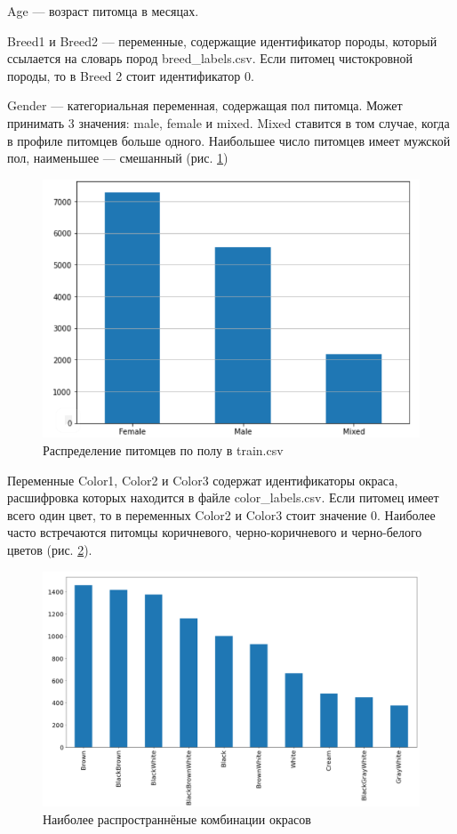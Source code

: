 \documentclass[14pt]{mmcs_article}
\begin{document}
Age --- возраст питомца в месяцах.

Breed1 и Breed2 --- переменные, содержащие идентификатор породы, который ссылается на словарь пород breed\_labels.csv. Если питомец чистокровной породы, то в Breed 2 стоит идентификатор 0.

Gender --- категориальная переменная, содержащая пол питомца. Может принимать 3 значения: male, female и mixed. Mixed ставится в том случае, когда в профиле питомцев больше одного. Наибольшее число питомцев имеет мужской пол, наименьшее — смешанный (рис. \ref{analyse:gender})

\begin{figure}[H]
	\centering
	\includegraphics[scale=0.8]{gender.png}
	\caption{Распределение питомцев по полу в train.csv}\label{analyse:gender}
\end{figure}

Переменные Color1, Color2 и Color3 содержат идентификаторы окраса, расшифровка которых находится в файле color\_labels.csv. Если питомец имеет всего один цвет, то в переменных Color2 и Color3 стоит значение 0. Наиболее часто встречаются питомцы коричневого, черно-коричневого и черно-белого цветов (рис. \ref{analyse:color}).

\begin{figure}[H]
	\centering
	\includegraphics[scale=0.5]{color.png}
	\caption{Наиболее распространнёные комбинации окрасов}\label{analyse:color}
\end{figure}
\end{document}
